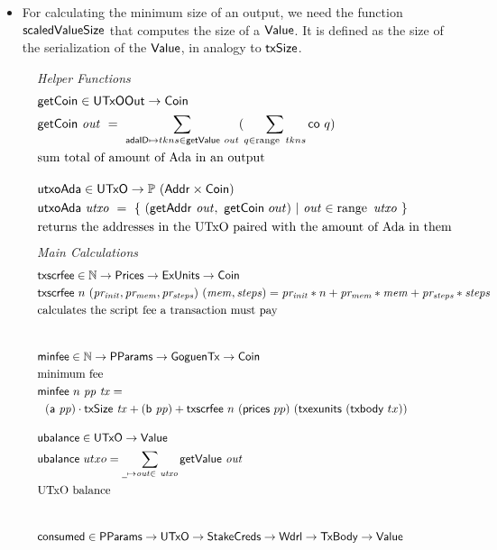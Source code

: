\begin{itemize}
  \item For calculating the minimum size of an output, we need the
  function $\mathsf{scaledValueSize}$ that computes the size of a
  $\mathsf{Value}$. It is defined as the size of the serialization of the
  $\mathsf{Value}$, in analogy to $\mathsf{txSize}$.
\end{itemize}

\begin{figure}[htb]
  \emph{Helper Functions}
  \begin{align*}
    & \fun{getCoin} \in \UTxOOut \to \Coin \\
    & \fun{getCoin}~{\var{out}} ~=~\sum_{\mathsf{adaID} \mapsto tkns \in \fun{getValue}~out}
       (\sum_{q \in \range~{tkns}} \fun{co}~q) \\
    & \text{sum total of amount of Ada in an output}
    \nextdef
    & \fun{utxoAda} \in \UTxO \to \powerset{(\Addr \times \Coin)} \\
    & \fun{utxoAda}~{\var{utxo}} ~=~\{~(\fun{getAddr}~\var{out},~\fun{getCoin}~{out})
    ~\vert~ \var{out} \in \range~\var{utxo} ~\} \\
    & \text{returns the addresses in the UTxO paired with the amount of Ada in them} \\
  \end{align*}
  \emph{Main Calculations}
  \begin{align*}
    & \fun{txscrfee} \in \N \to \Prices \to \ExUnits \to \Coin \\
    & \fun{txscrfee}~n~ (\var{pr_{init}, pr_{mem}, pr_{steps}})~ (\var{mem, steps})
    = \var{pr_{init}}*n + \var{pr_{mem}}*\var{mem} + \var{pr_{steps}}*\var{steps} \\
    & \text{calculates the script fee a transaction must pay} \\
    \nextdef
    &\fun{minfee} \in \N \to \PParams \to \GoguenTx \to \Coin \\
    & \text{minimum fee}\\
    &\fun{minfee}  ~n~\var{pp}~\var{tx} = \\
    &~~(\fun{a}~\var{pp}) \cdot \fun{txSize}~\var{tx} + (\fun{b}~\var{pp}) +
    \fun{txscrfee}~n~(\fun{prices}~{pp})~(\fun{txexunits}~(\fun{txbody}~{tx}))
    \nextdef
    & \fun{ubalance} \in \UTxO \to \Value \\
    & \fun{ubalance} ~ utxo = \sum_{\wcard\mapsto\var{out}\in~\var{utxo}}
    \fun{getValue}~\var{out} \\
    & \text{UTxO balance} \\
    \nextdef
    & \fun{consumed} \in \PParams \to \UTxO \to \StakeCreds \to \Wdrl \to \TxBody \to \Value \\

\end{align*}
\end{figure}

